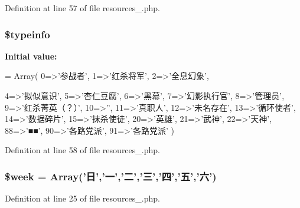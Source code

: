 Definition at line 57 of file resources\+\_.\+php.

\hypertarget{cache_2resources__1_8php_afeaf726d0642146d7bf10c04e2c99075}{
\subsubsection[{\$typeinfo}]{\setlength{\rightskip}{0pt plus 5cm}\$typeinfo}}\label{cache_2resources__1_8php_afeaf726d0642146d7bf10c04e2c99075}
{\bfseries Initial value\+:}
\begin{DoxyCode}
= Array(
    0=>\textcolor{stringliteral}{'参战者'},
    1=>\textcolor{stringliteral}{'红杀将军'},
    2=>\textcolor{stringliteral}{'全息幻象'},
    
    4=>\textcolor{stringliteral}{'拟似意识'},
    5=>\textcolor{stringliteral}{'杏仁豆腐'},
    6=>\textcolor{stringliteral}{'黑幕'},
    7=>\textcolor{stringliteral}{'幻影执行官'},
    8=>\textcolor{stringliteral}{'管理员'},
    9=>\textcolor{stringliteral}{'红杀菁英（？）'},
    10=>\textcolor{stringliteral}{''},
    11=>\textcolor{stringliteral}{'真职人'},
    12=>\textcolor{stringliteral}{'未名存在'},
    13=>\textcolor{stringliteral}{'循环使者'},
    14=>\textcolor{stringliteral}{'数据碎片'},
    15=>\textcolor{stringliteral}{'抹杀使徒'},
    20=>\textcolor{stringliteral}{'英雄'},
    21=>\textcolor{stringliteral}{'武神'},
    22=>\textcolor{stringliteral}{'天神'},
    88=>\textcolor{stringliteral}{'■■'},
    90=>\textcolor{stringliteral}{'各路党派'},
    91=>\textcolor{stringliteral}{'各路党派'}
    )
\end{DoxyCode}


Definition at line 58 of file resources\+\_.\+php.

\hypertarget{cache_2resources__1_8php_ad51e8a8cd3d4faaf3cb8e8b75dea029f}{
\subsubsection[{\$week}]{\setlength{\rightskip}{0pt plus 5cm}\$week = Array('日','一','二','三','四','五','六')}}\label{cache_2resources__1_8php_ad51e8a8cd3d4faaf3cb8e8b75dea029f}


Definition at line 25 of file resources\+\_.\+php.

